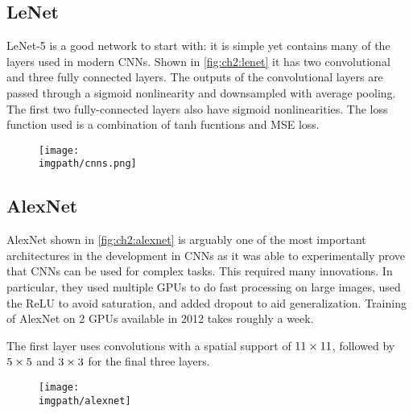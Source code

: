 \subsection{LeNet}
LeNet-5 \cite{lecun_gradient-based_1998} is a good network to start with: it
is simple yet contains many of the layers used in modern CNNs. Shown in
\autoref{fig:ch2:lenet} it has two convolutional and three fully connected
layers. The outputs of the convolutional layers are passed through a sigmoid
nonlinearity and downsampled with average pooling. The first two fully-connected
layers also have sigmoid nonlinearities. The loss function used is a combination
of tanh fucntions and MSE loss.

\begin{figure}
  \centering
  \texttt{[image: \\imgpath/cnns.png]}
  \label{fig:ch2:lenet}
\end{figure}

\subsection{AlexNet}
AlexNet \cite{krizhevsky_imagenet_2012} shown in \autoref{fig:ch2:alexnet} is
arguably one of the most important architectures in the development in CNNs as it 
was able to experimentally prove that CNNs can be used for complex tasks. This
required many innovations. In particular, they used multiple GPUs to do fast
processing on large images, used the ReLU to avoid saturation, and added dropout
to aid generalization. Training of AlexNet on 2 GPUs available in 2012 takes
roughly a week.

The first layer uses convolutions with a spatial support of $11\times11$, followed
by $5\times 5$ and $3\times 3$ for the final three layers.

\begin{figure}
  \centering
  \texttt{[image: \\imgpath/alexnet]}
  \label{fig:ch2:alexnet}
\end{figure}

